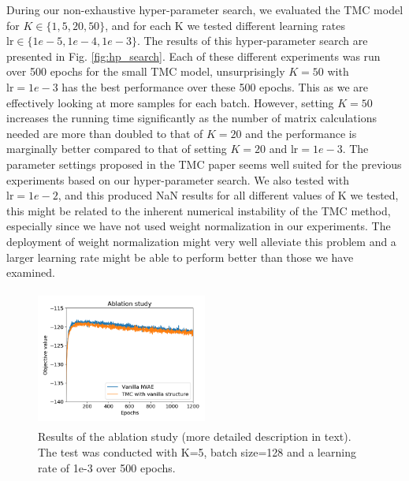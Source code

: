 During our non-exhaustive hyper-parameter search, we evaluated the TMC model for $K\in\{1, 5, 20, 50\}$, and for each K we tested different learning rates $\text{lr}\in\{1e-5, 1e-4, 1e-3\}$. The results of this hyper-parameter search are presented in Fig. \ref{fig:hp_search}. Each of these different experiments was run over 500 epochs for the small TMC model, unsurprisingly $K=50$ with $\text{lr}=1e-3$ has the best performance over these 500 epochs. This as we are effectively looking at more samples for each batch. However, setting $K=50$ increases the running time significantly as the number of matrix calculations needed are more than doubled to that of $K=20$ and the performance is marginally better compared to that of setting $K=20$ and $\text{lr}=1e-3$. The parameter settings proposed in the TMC paper seems well suited for the previous experiments based on our hyper-parameter search. We also tested with $\text{lr}=1e-2$, and this produced NaN results for all different values of K we tested, this might be related to the inherent numerical instability of the TMC method, especially since we have not used weight normalization in our experiments. The deployment of weight normalization might very well alleviate this problem and a larger learning rate might be able to perform better than those we have examined. 


\begin{figure}[th!]
    \centering
    \includegraphics[width=0.5\textwidth, height=4.5cm]{../openreview/Figures/ablation_study_tmc.png}
    \caption{Results of the ablation study (more detailed description in text). The test was conducted with K=5, batch size=128 and a learning rate of 1e-3 over 500 epochs.}
    \label{fig:ablation_study}
\end{figure}
